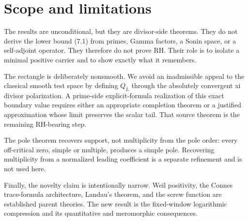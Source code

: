 \documentclass[11pt]{article}
\begin{document}
\section{Scope and limitations}

The results are unconditional, but they are divisor-side theorems.  They do not derive the lower
bound (7.1) from primes, Gamma factors, a Sonin space, or a self-adjoint operator.  They therefore
do not prove RH.  Their role is to isolate a minimal positive carrier and to show exactly what it
remembers.

The rectangle is deliberately nonsmooth.  We avoid an inadmissible appeal to the classical smooth
test space by defining $Q_L$ through the absolutely convergent xi divisor polarization.  A
prime-side explicit-formula realization of this exact boundary value requires either an
appropriate completion theorem or a justified approximation whose limit preserves the scalar
tail.  That source theorem is the remaining RH-bearing step.

The pole theorem recovers support, not multiplicity from the pole order: every off-critical zero,
simple or multiple, produces a simple pole.  Recovering multiplicity from a normalized leading
coefficient is a separate refinement and is not used here.

Finally, the novelty claim is intentionally narrow.  Weil positivity, the Connes trace-formula
architecture, Landau's theorem, and the screw function are established parent theories.  The new
result is the fixed-window logarithmic compression and its quantitative and meromorphic
consequences.
\end{document}
